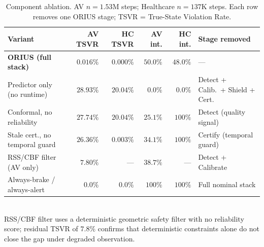 \begin{table}[t]
\centering
\caption{%
  Component ablation.  AV $n{=}1.53$M steps; Healthcare $n{=}137$K steps.
  Each row removes one ORIUS stage; TSVR = True-State Violation Rate.
}
\label{tab:ieee-ablation}
\small
\begin{tabular}{@{}p{}rrrrl@{}}
\toprule
\textbf{Variant} &
\textbf{AV TSVR} &
\textbf{HC TSVR} &
\textbf{AV int.} &
\textbf{HC int.} &
\textbf{Stage removed} \\
\midrule
\textbf{ORIUS (full stack)}
  & $\mathbf{0.016\%}$
  & $\mathbf{0.000\%}$
  & $50.0\%$
  & $48.0\%$
  & --- \\
Predictor only (no runtime)
  & $28.93\%$
  & $20.04\%$
  & $0.0\%$
  & $0.0\%$
  & Detect + Calib.\ + Shield + Cert. \\
Conformal, no reliability
  & $27.74\%$
  & $20.04\%$
  & $25.1\%$
  & $100\%$
  & Detect (quality signal) \\
Stale cert., no temporal guard
  & $26.36\%$
  & $0.003\%$
  & $34.1\%$
  & $100\%$
  & Certify (temporal guard) \\
RSS/CBF filter (AV only)
  & $7.80\%$
  & ---
  & $38.7\%$
  & ---
  & Detect + Calibrate \\
Always-brake / always-alert
  & $0.0\%$
  & $0.0\%$
  & $100\%$
  & $100\%$
  & Full nominal stack \\
\bottomrule
\end{tabular}\\[4pt]
{\footnotesize
  RSS/CBF filter uses a deterministic geometric safety filter with no reliability
  score; residual TSVR of $7.8\%$ confirms that deterministic constraints alone
  do not close the gap under degraded observation.
}
\end{table}
